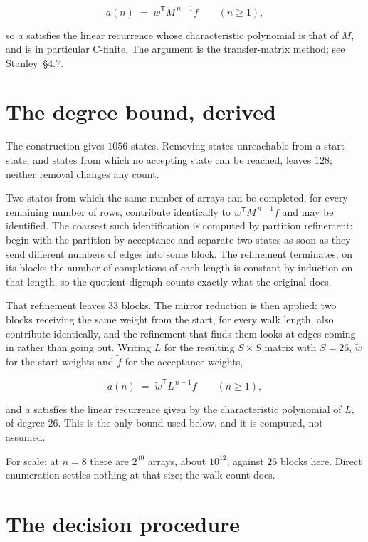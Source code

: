 \documentclass[11pt]{article}
\theoremstyle{definition}
\begin{document}
\[a(n) \;=\; w^{\mathsf T} M^{\,n-1} f \qquad (n \ge 1),\]

so $a$ satisfies the linear recurrence whose characteristic polynomial is that of $M$, and is in particular C-finite. The argument is the transfer-matrix method; see Stanley~\S4.7.

\section{The degree bound, derived}

The construction gives $1056$ states. Removing states unreachable from a start state, and states from which no accepting state can be reached, leaves $128$; neither removal changes any count.

Two states from which the same number of arrays can be completed, for every remaining number of rows, contribute identically to $w^{\mathsf T}M^{\,n-1}f$ and may be identified. The coarsest such identification is computed by partition refinement: begin with the partition by acceptance and separate two states as soon as they send different numbers of edges into some block. The refinement terminates; on its blocks the number of completions of each length is constant by induction on that length, so the quotient digraph counts exactly what the original does.

That refinement leaves $33$ blocks. The mirror reduction is then applied: two blocks receiving the same weight from the start, for every walk length, also contribute identically, and the refinement that finds them looks at edges coming in rather than going out. Writing $L$ for the resulting $S \times S$ matrix with $S = 26$, $\tilde w$ for the start weights and $\tilde f$ for the acceptance weights,

\[a(n) \;=\; \tilde w^{\mathsf T} L^{\,n-1} \tilde f \qquad (n \ge 1),\]

and $a$ satisfies the linear recurrence given by the characteristic polynomial of $L$, of degree $26$. This is the only bound used below, and it is computed, not assumed.

For scale: at $n = 8$ there are $2^{40}$ arrays, about $10^{12}$, against $26$ blocks here. Direct enumeration settles nothing at that size; the walk count does.

\section{The decision procedure}
\end{document}
